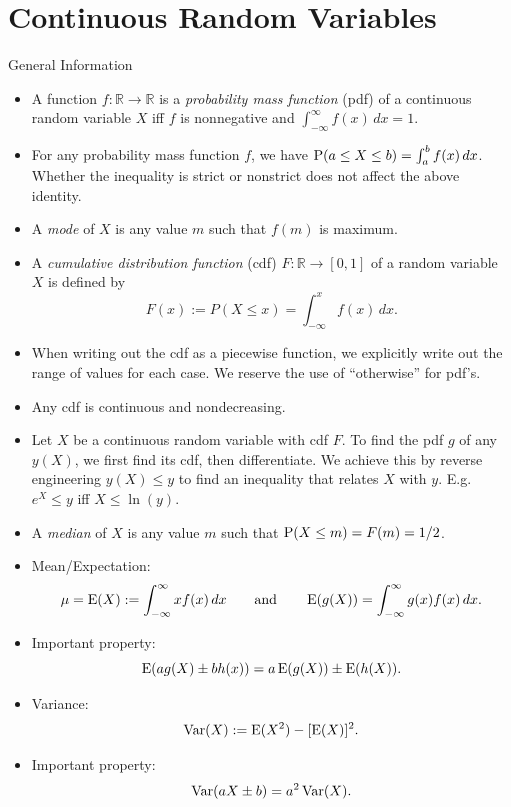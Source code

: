\documentclass[../Notes.tex]{subfiles}
\begin{document}
\chapter{Continuous Random Variables}
\begin{stbox}{General Information}
  \begin{itemize}
    \item A function \(f \colon \mathbb{R}\to \mathbb{R}\) is a \emph{probability mass function} (pdf) of a continuous random variable \(X\) iff \(f\) is nonnegative and \(\int_{-\infty}^{\infty}f(x)\,dx=1\).
    \item For any probability mass function \(f\), we have \(\operatorname{P}(a\leq X\leq b)=\int_{a}^{b}f(x)\,dx\). Whether the inequality is strict or nonstrict does not affect the above identity. 
    \item A \emph{mode} of \(X\) is any value \(m\) such that \(f(m)\) is maximum.
    \item A \emph{cumulative distribution function} (cdf) \(F \colon \mathbb{R}\to [0,1]\) of a random variable \(X\) is defined by
    \[F(x):=P(X\leq x)=\int_{-\infty}^{x}f(x)\,dx.\]
    \item When writing out the cdf as a piecewise function, we explicitly write out the range of values for each case. We reserve the use of ``otherwise'' for pdf's.
    \item Any cdf is continuous and nondecreasing.
    \item Let \(X\) be a continuous random variable with cdf \(F\). To find the pdf \(g\) of any \(y(X)\), we first find its cdf, then differentiate. We achieve this by reverse engineering \(y(X)\leq y\) to find an inequality that relates \(X\) with \(y\). E.g. \(e^X\leq y\) iff \(X\leq \ln(y)\).
    \item A \emph{median} of \(X\) is any value \(m\) such that \(\operatorname{P}(X\leq m)=F(m)=1/2\).
    \item Mean/Expectation: 
    \[\mu=\operatorname{E}(X):=\int_{-\infty}^{\infty}xf(x)\,dx \qquad\text{and}\qquad \operatorname{E}(g(X))=\int_{-\infty}^{\infty}g(x)f(x)\,dx.\]
    \item Important property: 
    \[\operatorname{E}(ag(X)\pm bh(x))=a\operatorname{E}(g(X))\pm\operatorname{E}(h(X)).\]
    \item Variance: 
    \[\operatorname{Var}(X):=\operatorname{E}(X^2)-[\operatorname{E}(X)]^2.\]
    \item Important property:
    \[\operatorname{Var}(aX\pm b)=a^2\operatorname{Var}(X).\]
  \end{itemize}
\end{stbox}
\end{document}
